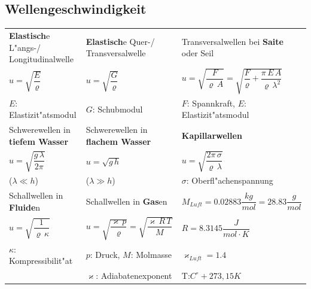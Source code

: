 \subsection{Wellengeschwindigkeit  }
\renewcommand{\arraystretch}{1.5}
\begin{tabular}{| p{6cm} | p{6cm} | p{6cm} |}
\hline
\textbf{Elastisch}e L"angs-/ Longitudinalwelle & \textbf{Elastisch}e Quer-/ Transversalwelle & Transversalwellen bei \textbf{Saite} oder Seil\\
$u=\sqrt{\dfrac{E}{\varrho}}$ & $u=\sqrt{\dfrac{G}{\varrho}}$ &
$u=\sqrt{\dfrac{F}{\varrho\,A}}=\sqrt{\dfrac{F}{\varrho}+\dfrac{\pi\,E\,A}{\varrho\,\lambda^2}}$
\\ $E$: Elastizit"atsmodul& $G$: Schubmodul & $F$: Spannkraft, $E$:
Elastizit"atsmodul \\
\hline

Schwerewellen in \textbf{tiefem Wasser} & Schwerewellen in \textbf{flachem Wasser}& \textbf{Kapillarwellen}\\
$u=\sqrt{\dfrac{g\,\lambda}{2\pi}}$&$u=\sqrt{g\,h}$&$u=\sqrt{\dfrac{2\pi\,\sigma}{\varrho\,\lambda}}$\\
($\lambda \ll h$) & ($\lambda \gg h$)  & $\sigma$: Oberfl"achenspannung \\
\hline

Schallwellen in \textbf{Fluide}n & Schallwellen in \textbf{Gas}en & $M_{Luft}=
0.02883 \dfrac{kg}{mol} = 28.83 \dfrac{g}{mol}$\\
$u=\sqrt{\dfrac{1}{\varrho\,\kappa}}$&$u=\sqrt{\dfrac{\varkappa\,p}{\varrho}}=\sqrt{\dfrac{\varkappa\,R\,T}{M}}$&$R=8.3145 \dfrac{J}{mol\cdot K}$\\
$\kappa$: Kompressibilit"at &$p$: Druck, $M$: Molmasse&$\varkappa_{Luft}=1.4$\\
& $\varkappa$: Adiabatenexponent&$\text{T:
}C^\circ+273,15K$\\
\hline
\end{tabular}
\renewcommand{\arraystretch}{1}


